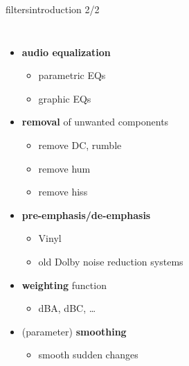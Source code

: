 	\begin{frame}{filters}{introduction 2/2}
        \vspace{-8mm}
        \begin{columns}
                \begin{itemize}
                    \item   \textbf{audio equalization}
                        \begin{itemize}
                            \item   parametric EQs
                            \item   graphic EQs
                        \end{itemize}
                    \item<2->   \textbf{removal} of unwanted components
                        \begin{itemize}
                            \item   remove DC, rumble
                            \item   remove hum
                            \item   remove hiss
                        \end{itemize}
                    \item<3->   \textbf{pre-emphasis/de-emphasis}
                        \begin{itemize}
                            \item   Vinyl
                            \item   old Dolby noise reduction systems
                        \end{itemize}
                    \item<4->   \textbf{weighting} function
                        \begin{itemize}
                            \item   dBA, dBC, \ldots
                        \end{itemize}
                    \item<5->   (parameter) \textbf{smoothing}
                        \begin{itemize}
                            \item   smooth sudden changes
                        \end{itemize}
                \end{itemize}

\end{columns}
\end{frame}
